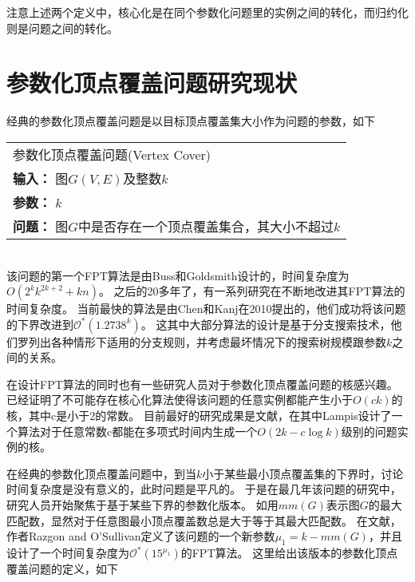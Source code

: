 注意上述两个定义中，核心化是在同个参数化问题里的实例之间的转化，而归约化则是问题之间的转化。

\section{参数化顶点覆盖问题研究现状}
经典的参数化顶点覆盖问题是以目标顶点覆盖集大小作为问题的参数，如下 \\

\begin{tabular}{| p{0.9\headwidth} |}
  \hline
  参数化顶点覆盖问题(Vertex Cover) \\
  \textbf{输入：} 图$G(V, E)$及整数$k$ \\
  \textbf{参数：} $k$\\
  \textbf{问题：} 图$G$中是否存在一个顶点覆盖集合，其大小不超过$k$\\
  \hline
\end{tabular} \vspace{0.5cm} \\

该问题的第一个FPT算法是由Buss和Goldsmith设计的，时间复杂度为$O(2^kk^{2k+2} + kn)$。
之后的20多年了，有一系列研究在不断地改进其FPT算法的时间复杂度。
当前最快的算法是由Chen和Kanj在2010提出的，他们成功将该问题的下界改进到$\mathcal{O}^*(1.2738^k)$。
这其中大部分算法的设计是基于分支搜索技术，他们罗列出各种情形下适用的分支规则，并考虑最坏情况下的搜索树规模跟参数$k$之间的关系。

在设计FPT算法的同时也有一些研究人员对于参数化顶点覆盖问题的核感兴趣。
已经证明了不可能存在核心化算法使得该问题的任意实例都能产生小于$O(ck)$的核，其中c是小于2的常数。
目前最好的研究成果是文献\cite{lampis2011kernel}，在其中Lampis设计了一个算法对于任意常数c都能在多项式时间内生成一个$O(2k - c \log k)$级别的问题实例的核。

在经典的参数化顶点覆盖问题中，到当$k$小于某些最小顶点覆盖集的下界时，讨论时间复杂度是没有意义的，此时问题是平凡的。
于是在最几年该问题的研究中，研究人员开始聚焦于基于某些下界的参数化版本。
如用$mm(G)$表示图$G$的最大匹配数，显然对于任意图最小顶点覆盖数总是大于等于其最大匹配数。
在文献\cite{razgon2009almost}，作者Razgon and O'Sullivan定义了该问题的一个新参数$\mu_1 = k - mm(G)$，并且设计了一个时间复杂度为$\mathcal{O}^*(15^{\mu_1})$的FPT算法。
这里给出该版本的参数化顶点覆盖问题的定义，如下\\

